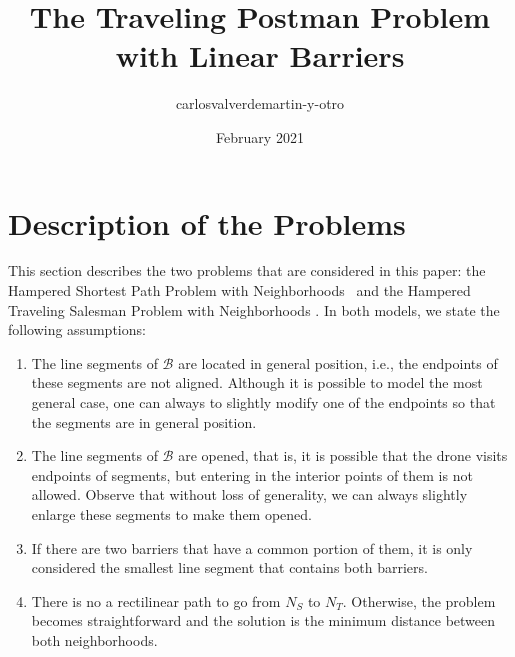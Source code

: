 \documentclass[a4paper]{elsarticle}
\title{The Traveling Postman Problem with Linear Barriers}
\author{carlosvalverdemartin-y-otro}
\date{February 2021}
\newcommand{\SPPN}{{\sf{H-SPPN}\xspace }}
\newcommand{\TSPN}{{\sf{H-TSPN}\xspace }}
\newcommand{\JP}[1]{{\color{armygreen}#1}}
\begin{document}
\maketitle
	\section{Description of the Problems}\label{section:description}
	This section describes the two problems that are considered in this paper: the Hampered Shortest Path Problem with Neighborhoods \SPPN \ and the Hampered Traveling Salesman Problem with Neighborhoods \TSPN. In both models, we state the following assumptions:
	
	\begin{enumerate}[label=\textbf{A\arabic*},ref=\textbf{A\arabic*}]
		\item \label{A1}The line segments of $\mathcal B$ are located in general position, i.e., the endpoints of these segments are not aligned. Although it is possible to model the most general case, \JP{one can always to slightly modify one of the endpoints so that the segments are in general position.}
		\item The line segments of $\mathcal B$ are opened, that is, it is possible that the drone visits  endpoints of segments, but entering  in the interior points of them is not allowed. \JP{Observe that without loss of generality, we can always slightly enlarge these segments to make them opened.}
		\item If there are two barriers that have a common portion of them, it is only considered the smallest line segment that contains both barriers.
		\item \label{A4}There is no a rectilinear path to go from $N_S$ to $N_T$. Otherwise, the problem becomes straightforward and the solution is the minimum distance between both neighborhoods.
	\end{enumerate}
	
	
\end{document}

